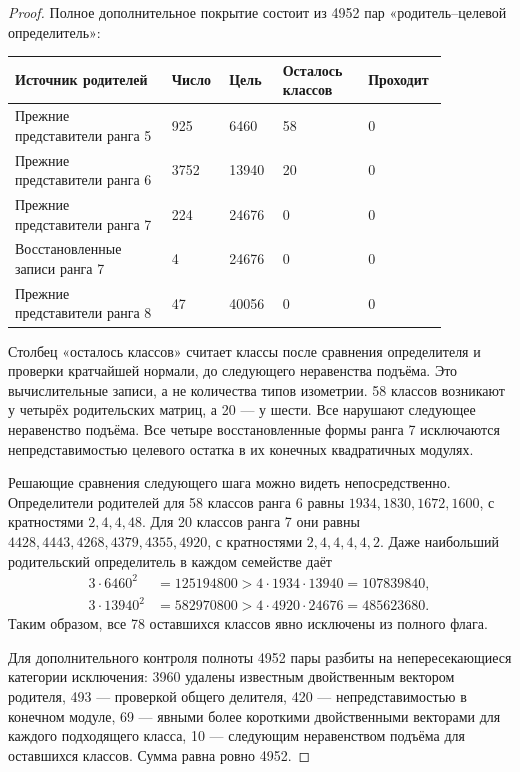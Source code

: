 \begin{proof}
Полное дополнительное покрытие состоит из 4952 пар «родитель--целевой определитель»:
\begin{center}
\begin{tabular}{P{0.33\linewidth}P{0.10\linewidth}P{0.11\linewidth}P{0.18\linewidth}P{0.14\linewidth}}
\toprule
Источник родителей & Число & Цель & Осталось классов & Проходит\\\midrule
Прежние представители ранга 5 &925&6460&58&0\\
Прежние представители ранга 6 &3752&13940&20&0\\
Прежние представители ранга 7 &224&24676&0&0\\
Восстановленные записи ранга 7 &4&24676&0&0\\
Прежние представители ранга 8 &47&40056&0&0\\
\bottomrule
\end{tabular}
\end{center}
Столбец «осталось классов» считает классы после сравнения определителя и проверки кратчайшей нормали, до следующего неравенства подъёма. Это вычислительные записи, а не количества типов изометрии. 58 классов возникают у четырёх родительских матриц, а 20 --- у шести. Все нарушают следующее неравенство подъёма. Все четыре восстановленные формы ранга 7 исключаются непредставимостью целевого остатка в их конечных квадратичных модулях.

Решающие сравнения следующего шага можно видеть непосредственно. Определители родителей для 58 классов ранга 6 равны $1934,1830,1672,1600$, с кратностями $2,4,4,48$. Для 20 классов ранга 7 они равны $4428,4443,4268,4379,4355,4920$, с кратностями $2,4,4,4,4,2$. Даже наибольший родительский определитель в каждом семействе даёт
\[
\begin{aligned}
3\cdot6460^2&=125194800>4\cdot1934\cdot13940=107839840,\\
3\cdot13940^2&=582970800>4\cdot4920\cdot24676=485623680.
\end{aligned}
\]
Таким образом, все 78 оставшихся классов явно исключены из полного флага.

Для дополнительного контроля полноты 4952 пары разбиты на непересекающиеся категории исключения: 3960 удалены известным двойственным вектором родителя, 493 --- проверкой общего делителя, 420 --- непредставимостью в конечном модуле, 69 --- явными более короткими двойственными векторами для каждого подходящего класса, 10 --- следующим неравенством подъёма для оставшихся классов. Сумма равна ровно 4952.


\end{proof}
